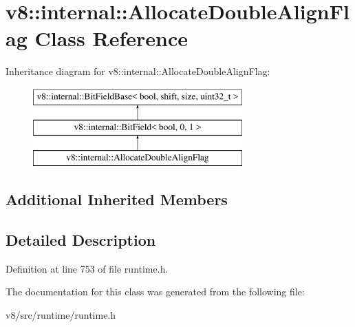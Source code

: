 \hypertarget{classv8_1_1internal_1_1AllocateDoubleAlignFlag}{}\section{v8\+:\+:internal\+:\+:Allocate\+Double\+Align\+Flag Class Reference}
\label{classv8_1_1internal_1_1AllocateDoubleAlignFlag}
Inheritance diagram for v8\+:\+:internal\+:\+:Allocate\+Double\+Align\+Flag\+:\begin{figure}[H]
\begin{center}
\leavevmode
\includegraphics[height=3.000000cm]{classv8_1_1internal_1_1AllocateDoubleAlignFlag}
\end{center}
\end{figure}
\subsection*{Additional Inherited Members}


\subsection{Detailed Description}


Definition at line 753 of file runtime.\+h.



The documentation for this class was generated from the following file\+:\begin{DoxyCompactItemize}
\item 
v8/src/runtime/runtime.\+h\end{DoxyCompactItemize}
